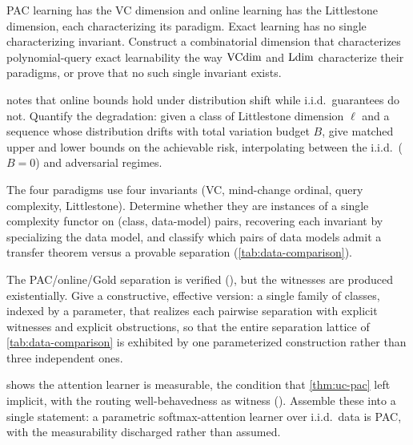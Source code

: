 \begin{openprob}
\label{op:query-dimension}
PAC learning has the VC dimension and online learning has the Littlestone dimension, each characterizing its paradigm. Exact learning has no single characterizing invariant. Construct a combinatorial dimension that characterizes polynomial-query exact learnability the way $\mathrm{VCdim}$ and $\mathrm{Ldim}$ characterize their paradigms, or prove that no such single invariant exists.
\end{openprob}

\begin{openprob}
\label{op:online-batch}
 notes that online bounds hold under distribution shift while i.i.d.\ guarantees do not. Quantify the degradation: given a class of Littlestone dimension $\ell$ and a sequence whose distribution drifts with total variation budget $B$, give matched upper and lower bounds on the achievable risk, interpolating between the i.i.d.\ ($B = 0$) and adversarial regimes.
\end{openprob}

\begin{openprob}
\label{op:unified-measure}
The four paradigms use four invariants (VC, mind-change ordinal, query complexity, Littlestone). Determine whether they are instances of a single complexity functor on (class, data-model) pairs, recovering each invariant by specializing the data model, and classify which pairs of data models admit a transfer theorem versus a provable separation (\cref{tab:data-comparison}).
\end{openprob}

\begin{openprob}
\label{op:three-way}
The PAC/online/Gold separation is verified (), but the witnesses are produced existentially. Give a constructive, effective version: a single family of classes, indexed by a parameter, that realizes each pairwise separation with explicit witnesses and explicit obstructions, so that the entire separation lattice of \cref{tab:data-comparison} is exhibited by one parameterized construction rather than three independent ones.
\end{openprob}

\begin{openprob}
\label{op:attention-measurable}
 shows the attention learner is measurable, the condition  that \cref{thm:uc-pac} left implicit, with the routing well-behavedness as witness ().  Assemble these into a single statement: a parametric softmax-attention learner over i.i.d.\ data is PAC, with the measurability discharged rather than assumed.
\end{openprob}

